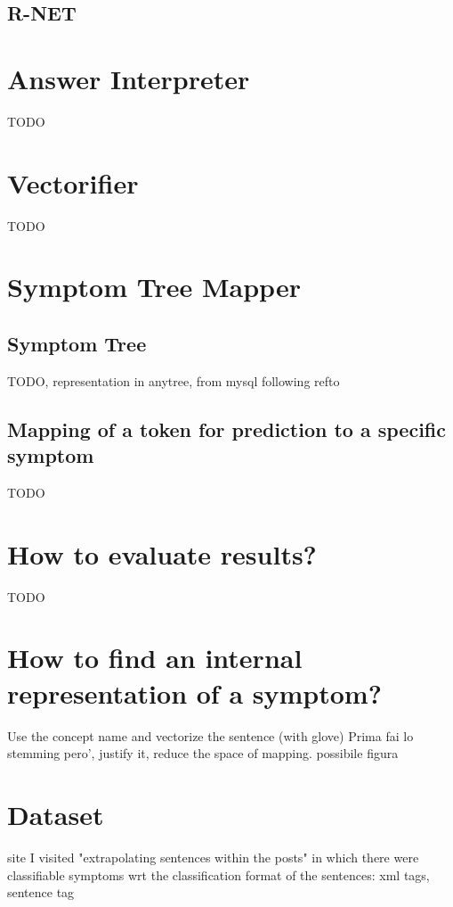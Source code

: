 \subsection{R-NET}



\section{Answer Interpreter}
\label{sec:answer_interpreter}
TODO


\section{Vectorifier}
\label{sec:body_part_finder}
TODO

\section{Symptom Tree Mapper}
\label{sec:symptom_tree_mapper}
\subsection{Symptom Tree}
TODO, representation in anytree, from mysql following refto

\subsection{Mapping of a token for prediction to a specific symptom}
TODO


\section{How to evaluate results?}
\label{sec:eval_results}
TODO


\section{How to find an internal representation of a symptom?}
Use the concept name and vectorize the sentence (with glove)
Prima fai lo stemming pero', justify it, reduce the space of mapping. possibile figura


\section{Dataset}
site I visited
"extrapolating sentences within the posts" in which there were classifiable symptoms wrt the classification
format of the sentences: xml tags, sentence tag